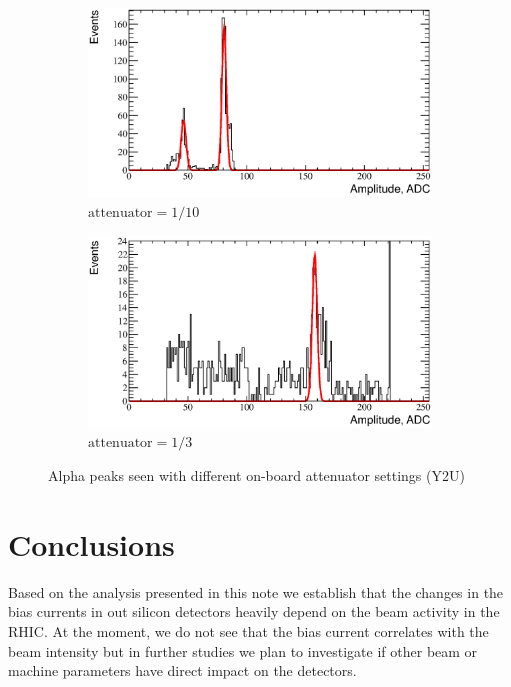 \documentclass[a4paper,12pt]{article}
\begin{document}
\begin{figure}[htb]
\begin{subfigure}[t]{0.49\textwidth}
\includegraphics[width=\textwidth]{gfx/atten_1_over_10_ch06.eps}
\caption{$\text{attenuator}=1/10$}
\end{subfigure}
%
\hfill
%
\begin{subfigure}[t]{0.49\textwidth}
\includegraphics[width=\textwidth]{gfx/atten_1_over_3_ch06.eps}
\caption{$\text{attenuator}=1/3$}
\end{subfigure}
\caption{Alpha peaks seen with different on-board attenuator settings (Y2U)}
\label{fig:atten_distrib}
\end{figure}


\section{Conclusions}

Based on the analysis presented in this note we establish that the changes in
the bias currents in out silicon detectors heavily depend on the beam activity
in the RHIC. At the moment, we do not see that the bias current correlates with
the beam intensity but in further studies we plan to investigate if other beam
or machine parameters have direct impact on the detectors.
\end{document}
